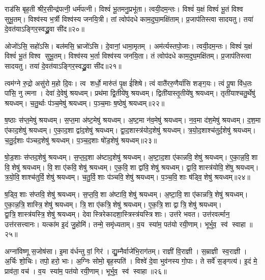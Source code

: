    राड॑सि बृह॒ती श्रीर॒सीन्द्र॑पत्नी॒ धर्म॑पत्नी।
   विश्वं॑ भू॒तमनु॒प्रभू॑ता।
   त्वयी॒दम॒न्तः।
   विश्वं॑ य॒क्षं विश्वं॑ भू॒तं विश्व सुभू॒तम्।
   विश्व॑स्य भ॒र्त्री विश्व॑स्य जनयि॒त्री।
   तां त्वोप॑दधे काम॒दुघा॒मक्षि॑ताम्।
   प्र॒जाप॑तिस्त्वा सादयतु।
   तया॑ दे॒वत॑याऽङ्गिर॒स्वद्ध्रु॒वा सी॑द॥२०॥

   ओजो॑ऽसि॒ सहो॑ऽसि।
   बल॑मसि॒ भ्राजो॑ऽसि।
   दे॒वानां॒ धामा॒मृतम्।
   अम॑र्त्यस्तपो॒जाः।
   त्वयी॒दम॒न्तः।
   विश्वं॑ य॒क्षं विश्वं॑ भू॒तं विश्व सुभू॒तम्।
   विश्व॑स्य भ॒र्ता विश्व॑स्य जनयि॒ता।
   तं त्वोप॑दधे काम॒दुघ॒मक्षि॑तम्।
   प्र॒जाप॑तिस्त्वा सादयतु।
   तया॑ दे॒वत॑याऽङ्गिर॒स्वद्ध्रु॒वा सी॑द॥२१॥
\anuvakamend

   त्वम॑ग्ने रु॒द्रो असु॑रो म॒हो दि॒वः।
   त्व शर्धो॒ मारु॑तं पृ॒क्ष ई॑शिषे।
   त्वं वातै॑ररु॒णैर्या॑सि शङ्ग॒यः।
   त्वं पू॒षा वि॑ध॒तः पा॑सि॒ नु त्मना।
   देवा॑ दे॒वेषु॑ श्रयध्वम्।
   प्रथ॑मा द्वि॒तीये॑षु श्रयध्वम्।
   द्विती॑यास्तृ॒तीये॑षु श्रयध्वम्।
   तृती॑याश्चतु॒र्थेषु॑ श्रयध्वम्।
   च॒तु॒र्थाः प॑ञ्च॒मेषु॑ श्रयध्वम्।
   प॒ञ्च॒माः ष॒ष्ठेषु॑ श्रयध्वम्॥२२॥

   ष॒ष्ठाः स॑प्त॒मेषु॑ श्रयध्वम्।
   स॒प्त॒मा अ॑ष्ट॒मेषु॑ श्रयध्वम्।
   अ॒ष्ट॒मा न॑व॒मेषु॑ श्रयध्वम्।
   न॒व॒मा द॑श॒मेषु॑ श्रयध्वम्।
   द॒श॒मा ए॑काद॒शेषु॑ श्रयध्वम्।
   ए॒का॒द॒शा द्वा॑द॒शेषु॑ श्रयध्वम्।
   द्वा॒द॒शास्त्र॑योद॒शेषु॑ श्रयध्वम्।
   त्र॒यो॒द॒शाश्च॑तुर्द॒शेषु॑ श्रयध्वम्।
   च॒तु॒र्द॒शाः प॑ञ्चद॒शेषु॑ श्रयध्वम्।
   प॒ञ्च॒द॒शाः षो॑ड॒शेषु॑ श्रयध्वम्॥२३॥

   षो॒ड॒शाः स॑प्तद॒शेषु॑ श्रयध्वम्।
   स॒प्त॒द॒शा अ॑ष्टाद॒शेषु॑ श्रयध्वम्।
   अ॒ष्टा॒द॒शा ए॑कान्नवि॒शेषु॑ श्रयध्वम्।
   ए॒का॒न्न॒वि॒शा वि॒शेषु॑ श्रयध्वम्।
   वि॒शा ए॑कवि॒शेषु॑ श्रयध्वम्।
   ए॒क॒वि॒शा द्वा॑वि॒शेषु॑ श्रयध्वम्।
   द्वा॒वि॒शास्त्र॑योवि॒शे॑षु श्रयध्वम्।
   त्र॒यो॒वि॒शाश्च॑तुर्वि॒शेषु॑ श्रयध्वम्।
   च॒तु॒र्वि॒शाः प॑ञ्चवि॒शेषु॑ श्रयध्वम्।
   प॒ञ्च॒वि॒शाः ष॑ड्वि॒शेषु॑ श्रयध्वम्॥२४॥

   ष॒ड्वि॒शाः स॑प्तवि॒शेषु॑ श्रयध्वम्।
   स॒प्त॒वि॒शा अ॑ष्टावि॒शेषु॑ श्रयध्वम्।
   अ॒ष्टा॒वि॒शा ए॑कान्नत्रि॒शेषु॑ श्रयध्वम्।
   ए॒का॒न्न॒त्रि॒शास्त्रि॒शेषु॑ श्रयध्वम्।
   त्रि॒शा ए॑कत्रि॒शेषु॑ श्रयध्वम्।
   ए॒क॒त्रि॒शा द्वात्रि॒शेषु॑ श्रयध्वम्।
   द्वा॒त्रि॒शास्त्र॑य\-स्त्रि॒\-शेषु॑ श्रयध्वम्।
   देवास्त्रिरेकादशा॒स्त्रिस्त्र॑य\-स्त्रिशाः।
   उत्त॑रे भवत।
   उत्त॑रवर्त्मान॒ उत्त॑रसत्त्वानः।
   यत्का॑म इ॒दं जु॒होमि॑।
   तन्मे॒ समृ॑ध्यताम्।
   व॒य स्या॑म॒ पत॑यो रयी॒णाम्।
   भूर्भुव॒ स्व॑ स्वाहा॥२५॥
   \anuvakamend
   
   अग्ना॑विष्णू स॒जोष॑सा।
   इ॒मा व॑र्धन्तु वां॒ गिर॑।
   द्यु॒म्नैर्वाजे॑भि॒राग॑तम्।
   राज्ञी॑ वि॒राज्ञी।
   स॒म्राज्ञी स्व॒राज्ञी।
   अ॒र्चिः शो॒चिः।
   तपो॒ हरो॒ भाः।
   अ॒ग्निः सोमो॒ बृह॒स्पति॑।
   विश्वे॑ दे॒वा भुव॑नस्य गो॒पाः।
   ते सर्वे॑ स॒ङ्गत्य॑।
   इ॒दं मे॒ प्राव॑ता॒ वच॑।
   व॒य स्या॑म॒ पत॑यो रयी॒णाम्।
   भूर्भुव॒ स्व॑ स्वाहा॥२६॥
   \anuvakamend
   
